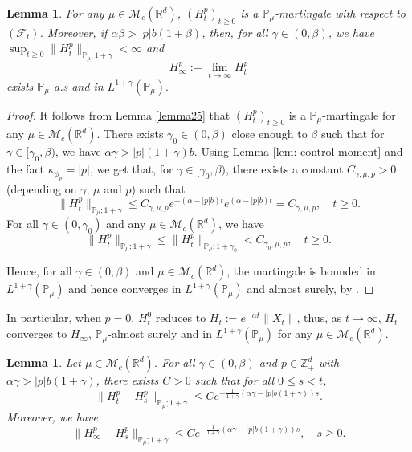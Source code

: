 \documentclass[12pt,a4paper]{amsart}
\theoremstyle{plain}
\newtheorem{lem}[thm]{Lemma}
\theoremstyle{definition}
\numberwithin{equation}{section}
\begin{document}
\begin{lem}\label{lemma26}
    For any $\mu\in \mathcal M_c(\mathbb R^d)$, $(H^p_t)_{t\geq 0}$ is a $\mathbb P_\mu$-martingale with respect to $(\mathscr F_t)$. Moreover, if $\alpha\beta>|p|b(1+\beta)$, then, for all $\gamma\in (0, \beta)$, we have $\sup_{t\geq 0}\|H_t^p\|_{\mathbb P_\mu;1+\gamma}< \infty$ and
\[
    H_{\infty}^p
    :=\lim_{t\rightarrow \infty}H_t^p
\]
    exists $\mathbb{P}_{\mu}$-a.s and in $L^{1+\gamma}(\mathbb{P}_{\mu}).$
\end{lem}
\begin{proof}
    It follows from Lemma \ref{lemma25} that $(H_t^p)_{t\geq 0}$ is a $\mathbb P_\mu$-martingale for any $\mu\in \mathcal M_c(\mathbb R^d)$.
    There exists $\gamma_0 \in (0,\beta)$ close enough to $\beta$ such that for $\gamma\in [\gamma_0, \beta)$, we have $\alpha\gamma>|p|(1+\gamma)b$.
    Using  Lemma \ref{lem: control moment} and the fact $\kappa_{\phi_p}=|p|$, we get that, for $\gamma\in [\gamma_0, \beta)$, there exists a constant $C_{\gamma, \mu, p}>0$ (depending on $\gamma$, $\mu$ and $p$) such that
\[
 	\|H_t^p\|_{\mathbb P_\mu;1+\gamma}
    \leq C_{\gamma, \mu, p} e^{-(\alpha-|p|b)t}e^{(\alpha-|p|b)t}
    =C_{\gamma, \mu, p}, \quad t\geq 0.
\]
    For all $\gamma\in (0, \gamma_0)$ and any $\mu\in \mathcal M_c(\mathbb R^d)$, we have
\[
	\|H_t^p\|_{\mathbb P_\mu;1+\gamma}
	\leq\|H_t^p\|_{\mathbb P_\mu;1+\gamma_0}
	<C_{\gamma_0, \mu, p},
	\quad t\geq 0.
\]

    Hence, for all $\gamma \in (0,\beta)$ and $\mu\in \mathcal M_c(\mathbb R^d)$, the martingale is bounded in $L^{1+\gamma}(\mathbb{P}_{\mu})$ and hence converges in $L^{1+\gamma}(\mathbb{P}_{\mu}) $ and almost surely, by \cite[Theorem 5.4.5]{Durrett2010Probability}.
\end{proof}

    In particular, when $p=0$, $H_t^0$ reduces to $H_t:=e^{-\alpha t}\|X_t\|$, thus, as $t\rightarrow \infty$, $H_t$ converges to $H_{\infty}$, $\mathbb{P}_{\mu}$-almost surely and in $L^{1+\gamma}(\mathbb{P}_{\mu})$  for any $\mu\in \mathcal M_c(\mathbb R^d)$.

\begin{lem}\label{lem: control of wt}
    Let $\mu\in \mathcal M_c(\mathbb R^d)$.
    For all $\gamma\in (0,\beta)$ and $p\in \mathbb{Z}_+^d$ with $\alpha \gamma > |p|b(1+\gamma)$, there exists $C> 0$ such that for all $0\leq s<t$,
\[
    \|H^p_t-H^p_s\|_{\mathbb{P}_{\mu};1+\gamma}
    \leq C e^{-\frac{ 1}{1+\gamma}(\alpha\gamma-|p|b(1+\gamma))s}.
\]
    Moreover, we have
\[
    \|H^p_\infty-H^p_s\|_{\mathbb{P}_{\mu};1+\gamma}
    \leq C e^{-\frac{ 1}{1+\gamma}(\alpha\gamma-|p|b(1+\gamma))s},\quad s\geq 0.
\]
\end{lem}
\end{document}
